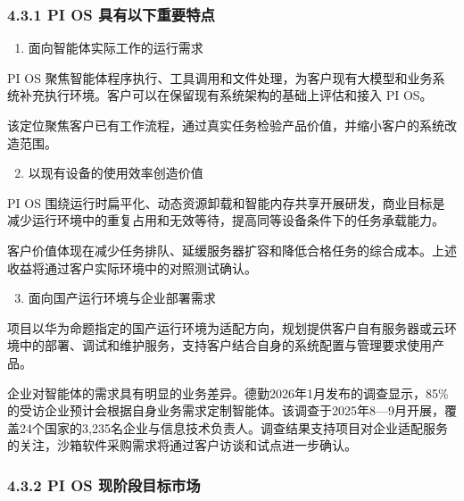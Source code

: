 \subsubsection{4.3.1 PI OS 具有以下重要特点}\label{pi-os-ux5177ux6709ux4ee5ux4e0bux91cdux8981ux7279ux70b9}

\begin{enumerate}

\item
  面向智能体实际工作的运行需求
\end{enumerate}

PI OS 聚焦智能体程序执行、工具调用和文件处理，为客户现有大模型和业务系统补充执行环境。客户可以在保留现有系统架构的基础上评估和接入 PI OS。

该定位聚焦客户已有工作流程，通过真实任务检验产品价值，并缩小客户的系统改造范围。

\begin{enumerate}

\setcounter{enumi}{1}
\item
  以现有设备的使用效率创造价值
\end{enumerate}

PI OS 围绕运行时扁平化、动态资源卸载和智能内存共享开展研发，商业目标是减少运行环境中的重复占用和无效等待，提高同等设备条件下的任务承载能力。

客户价值体现在减少任务排队、延缓服务器扩容和降低合格任务的综合成本。上述收益将通过客户实际环境中的对照测试确认。

\begin{enumerate}

\setcounter{enumi}{2}
\item
  面向国产运行环境与企业部署需求
\end{enumerate}

项目以华为命题指定的国产运行环境为适配方向，规划提供客户自有服务器或云环境中的部署、调试和维护服务，支持客户结合自身的系统配置与管理要求使用产品。

企业对智能体的需求具有明显的业务差异。德勤2026年1月发布的调查显示，85\%的受访企业预计会根据自身业务需求定制智能体。该调查于2025年8---9月开展，覆盖24个国家的3,235名企业与信息技术负责人。调查结果支持项目对企业适配服务的关注，沙箱软件采购需求将通过客户访谈和试点进一步确认。

\subsubsection{4.3.2 PI OS 现阶段目标市场}\label{pi-os-ux73b0ux9636ux6bb5ux76eeux6807ux5e02ux573a}

